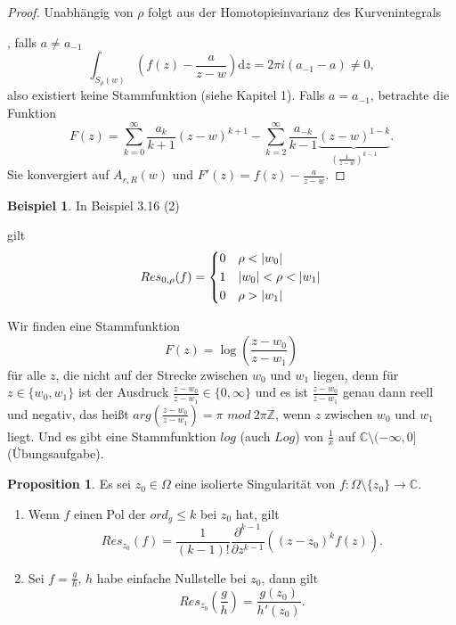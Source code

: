 \documentclass[11pt,titlepage]{article}
\theoremstyle{definition}
\newtheorem{proposition}[theorem]{Proposition}
\newtheorem{example}[theorem]{Beispiel}
\theoremstyle{remark}
\begin{document}
	\begin{proof}
		 Unabhängig von $\rho$ folgt aus der Homotopieinvarianz des Kurvenintegrals
		 
		 
		 , falls $a\neq a_{-1}$
		 \[ \int_{S_{\rho}(w)} \left( f(z)-\frac{a}{z-w}\right)\mathrm{d}z=2\pi i(a_{-1}-a)\neq 0,\]
		 also existiert keine Stammfunktion (siehe Kapitel 1). Falls $a=a_{-1}$, betrachte die Funktion 
		 \[ F(z)=\sum_{k=0}^{\infty} \frac{a_k}{k+1}(z-w)^{k+1} -\sum_{k=2}^{\infty} \frac{a_{-k}}{k-1}
		 \underbrace{(z-w)^{1-k}}_{(\frac{1}{z-w})^{k-1}}. \]
		 Sie konvergiert auf $A_{r,R}(w)$ und $F'(z)=f(z)-\frac{a}{z-w}$.
	\end{proof}
	
	\begin{example}
		In Beispiel 3.16 (2)
		
		
		gilt
		\[ Res_{0,\rho}(f)=\begin{dcases} 0& \rho<|w_0| \\ 1&|w_0|<\rho<|w_1| \\ 0&\rho>|w_1| \end{dcases}\] 
		
		
		Wir finden eine Stammfunktion
		\[ F(z)=\log\left(\frac{z-w_0}{z-w_1}\right) \]
		für alle $z$, die nicht auf der Strecke zwischen $w_0$ und $w_1$ liegen, denn für 
		$z\in\{w_0,w_1\}$ ist der Ausdruck $\frac{z-w_0}{z-w_1}\in\{0,\infty\}$ und es ist $\frac{z-w_0}{z-w_1}$ 
		genau dann reell und negativ, das heißt $arg\left(\frac{z-w_0}{z-w_1}\right)=\pi$  
		$mod\  2\pi\mathbb{Z}$, wenn $z$ zwischen $w_0$ und $w_1$ liegt. Und es gibt eine 
		Stammfunktion $log$ (auch $Log$) von $\frac{1}{x}$ auf $\mathbb{C}\setminus(-\infty,0]$ 
		(Übungsaufgabe).
		
		
	\end{example}
	
	\begin{proposition}
		Es sei $z_0\in\Omega$ eine isolierte Singularität von $f:\Omega\setminus\{z_0\}\to\mathbb{C}$.
		\begin{enumerate}
			\item Wenn $f$ einen Pol der $ord_g\leq k$ bei $z_0$ hat, gilt 
			\[ Res_{z_0}(f)=\frac{1}{(k-1)!} \frac{\partial^{k-1}}{\partial z^{k-1}}\left((z-z_0)^kf(z)\right). \]
			
			\item Sei $f=\frac{g}{h}$, $h$ habe einfache Nullstelle bei $z_0$, dann gilt
			\[ Res_{z_0} \left(\frac{g}{h}\right)=\frac{g(z_0)}{h'(z_0)}. \]
		\end{enumerate}
	\end{proposition}
	
\end{document}
